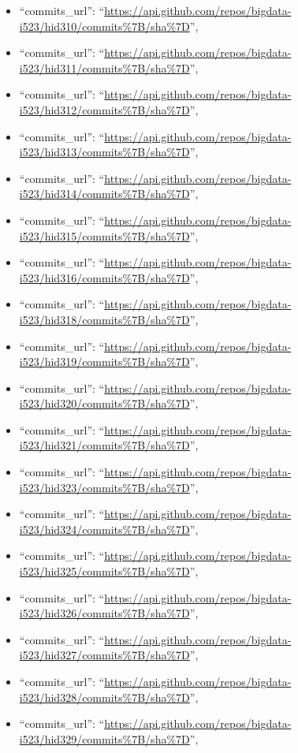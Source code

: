 \begin{itemize}
\item
  ``commits\_url'':
  ``\url{https://api.github.com/repos/bigdata-i523/hid310/commits\%7B/sha\%7D}'',
\item
  ``commits\_url'':
  ``\url{https://api.github.com/repos/bigdata-i523/hid311/commits\%7B/sha\%7D}'',
\item
  ``commits\_url'':
  ``\url{https://api.github.com/repos/bigdata-i523/hid312/commits\%7B/sha\%7D}'',
\item
  ``commits\_url'':
  ``\url{https://api.github.com/repos/bigdata-i523/hid313/commits\%7B/sha\%7D}'',
\item
  ``commits\_url'':
  ``\url{https://api.github.com/repos/bigdata-i523/hid314/commits\%7B/sha\%7D}'',
\item
  ``commits\_url'':
  ``\url{https://api.github.com/repos/bigdata-i523/hid315/commits\%7B/sha\%7D}'',
\item
  ``commits\_url'':
  ``\url{https://api.github.com/repos/bigdata-i523/hid316/commits\%7B/sha\%7D}'',
\item
  ``commits\_url'':
  ``\url{https://api.github.com/repos/bigdata-i523/hid318/commits\%7B/sha\%7D}'',
\item
  ``commits\_url'':
  ``\url{https://api.github.com/repos/bigdata-i523/hid319/commits\%7B/sha\%7D}'',
\item
  ``commits\_url'':
  ``\url{https://api.github.com/repos/bigdata-i523/hid320/commits\%7B/sha\%7D}'',
\item
  ``commits\_url'':
  ``\url{https://api.github.com/repos/bigdata-i523/hid321/commits\%7B/sha\%7D}'',
\item
  ``commits\_url'':
  ``\url{https://api.github.com/repos/bigdata-i523/hid323/commits\%7B/sha\%7D}'',
\item
  ``commits\_url'':
  ``\url{https://api.github.com/repos/bigdata-i523/hid324/commits\%7B/sha\%7D}'',
\item
  ``commits\_url'':
  ``\url{https://api.github.com/repos/bigdata-i523/hid325/commits\%7B/sha\%7D}'',
\item
  ``commits\_url'':
  ``\url{https://api.github.com/repos/bigdata-i523/hid326/commits\%7B/sha\%7D}'',
\item
  ``commits\_url'':
  ``\url{https://api.github.com/repos/bigdata-i523/hid327/commits\%7B/sha\%7D}'',
\item
  ``commits\_url'':
  ``\url{https://api.github.com/repos/bigdata-i523/hid328/commits\%7B/sha\%7D}'',
\item
  ``commits\_url'':
  ``\url{https://api.github.com/repos/bigdata-i523/hid329/commits\%7B/sha\%7D}'',

\end{itemize}
